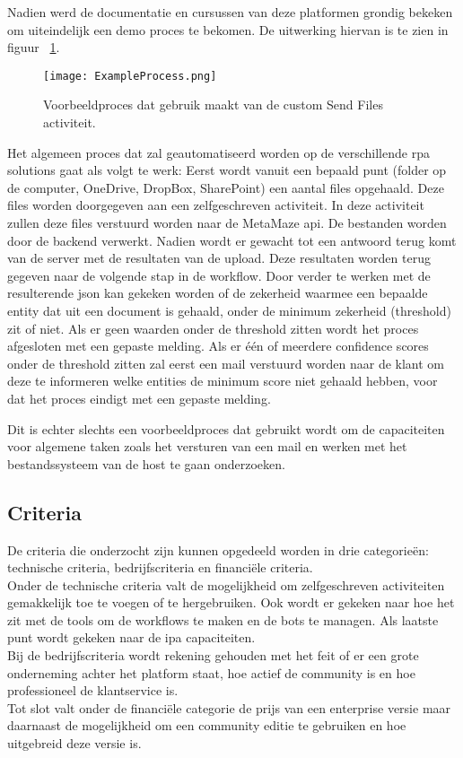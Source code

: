  Nadien werd de documentatie en cursussen van deze platformen grondig bekeken om uiteindelijk een demo proces te bekomen. De uitwerking hiervan is te zien in figuur ~\ref{fig:exampleProcess}.

\begin{figure}[h]
	\texttt{[image: ExampleProcess.png]}
	\caption[Te automatiseren demoproces]{Voorbeeldproces dat gebruik maakt van de custom Send Files \gls{activiteit}.}
	\label{fig:exampleProcess}
\end{figure}

Het algemeen proces dat zal geautomatiseerd worden op de verschillende \acrshort{rpa} solutions gaat als volgt te werk: Eerst wordt vanuit een bepaald punt (folder op de computer, OneDrive, DropBox, SharePoint) een aantal files opgehaald. Deze files worden doorgegeven aan een zelfgeschreven \gls{activiteit}. In deze \gls{activiteit} zullen deze files verstuurd worden naar de MetaMaze \acrshort{api}. De bestanden worden door de backend verwerkt. Nadien wordt er gewacht tot een antwoord terug komt van de server met de resultaten van de upload. Deze resultaten worden terug gegeven naar de volgende stap in de \gls{workflow}. Door verder te werken met de resulterende \acrshort{json} kan gekeken worden of de zekerheid waarmee een bepaalde entity dat uit een document is gehaald, onder de minimum zekerheid (threshold) zit of niet. Als er geen waarden onder de threshold zitten wordt het proces afgesloten met een gepaste melding. Als er één of meerdere confidence scores onder de threshold zitten zal eerst een mail verstuurd worden naar de klant om deze te informeren welke entities de minimum score niet gehaald hebben, voor dat het proces eindigt met een gepaste melding.

Dit is echter slechts een voorbeeldproces dat gebruikt wordt om de capaciteiten voor algemene taken zoals het versturen van een mail en werken met het bestandssysteem van de host te gaan onderzoeken.

\subsection{Criteria}
De criteria die onderzocht zijn kunnen opgedeeld worden in drie categorieën: technische criteria, bedrijfscriteria en financiële criteria.\\
Onder de technische criteria valt de mogelijkheid om zelfgeschreven \gls{activiteit}en gemakkelijk toe te voegen of te hergebruiken. Ook wordt er gekeken naar hoe het zit met de tools om de \gls{workflow}s te maken en de bots te managen. Als laatste punt wordt gekeken naar de \acrshort{ipa} capaciteiten.\\
Bij de bedrijfscriteria wordt rekening gehouden met het feit of er een grote onderneming achter het platform staat, hoe actief de community is en hoe professioneel de klantservice is.\\
Tot slot valt onder de financiële categorie de prijs van een enterprise versie maar daarnaast de mogelijkheid om een community editie te gebruiken en hoe uitgebreid deze versie is.

